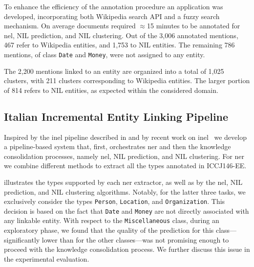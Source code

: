 
To enhance the efficiency of the annotation procedure an application was developed, incorporating both Wikipedia search API and a fuzzy search mechanism. On average documents required $\approx$15 minutes to be annotated for \ac{nel}, NIL prediction, and NIL clustering. Out of the 3,006 annotated mentions, 467 refer to Wikipedia entities, and 1,753 to NIL entities. The remaining 786 mentions, of class \texttt{Date} and \texttt{Money}, were not assigned to any entity.


The 2,200 mentions linked to an entity are organized into a total of 1,025 clusters, with 211 clusters corresponding to Wikipedia entities.
The larger portion of 814 refers to NIL entities, as expected within the considered domain.

\subsection{Italian Incremental Entity Linking Pipeline}
\label{sec:italia_ee_pipeline}

Inspired by the \ac{inel} pipeline described in  and by recent work on \ac{inel}~\cite{Heist2023nastylinker,kassner-etal-2022-edin} we develop a pipeline-based system that, first, orchestrates \ac{ner} and then the knowledge consolidation processes, namely \ac{nel}, NIL prediction, and NIL clustering.
For \ac{ner} we combine different methods to extract all the types annotated in ICCJ146-EE.

 illustrates the types supported by each \ac{ner} extractor, as well as by the \ac{nel}, NIL prediction, and NIL clustering algorithms. Notably, for the latter three tasks, we exclusively consider the types \texttt{Person}, \texttt{Location}, and \texttt{Organization}. This decision is based on the fact that \texttt{Date} and \texttt{Money} are not directly associated with any linkable entity. With respect to the \texttt{Miscellaneous} class, during an exploratory phase, we found that the quality of the prediction for this class---significantly lower than for the other classes---was not promising enough to proceed with the knowledge consolidation process. We further discuss this issue in the experimental evaluation.


